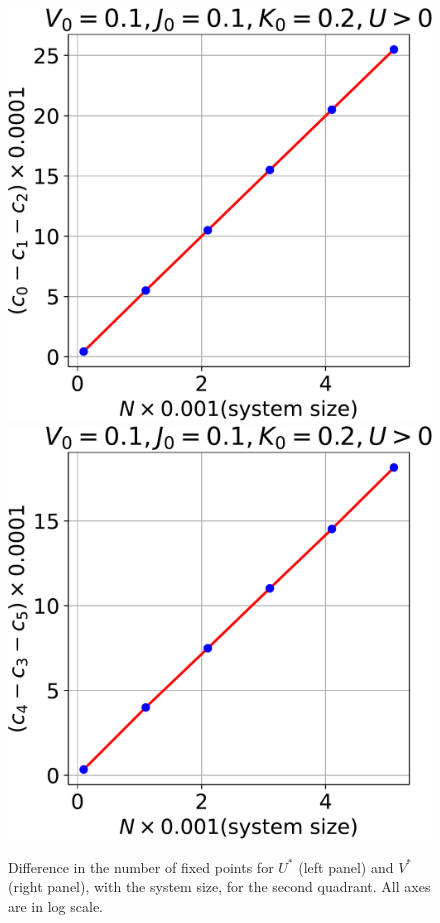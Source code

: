 \documentclass[12pt,twoside]{article}
\numberwithin{equation}{section}
\begin{document}
\begin{figure}[htpb!]
\centering
\includegraphics[scale=0.39]{../figures/frac_vs_D_quad2.pdf}
\includegraphics[scale=0.39]{../figures/frac_vs_D_quad22.pdf}
\caption{Difference in the number of fixed points for $U^*$ (left panel) and \(V^*\) (right panel), with the system size, for the second quadrant. All axes are in log scale.}
\label{q2_frac}
\end{figure}
\end{document}
